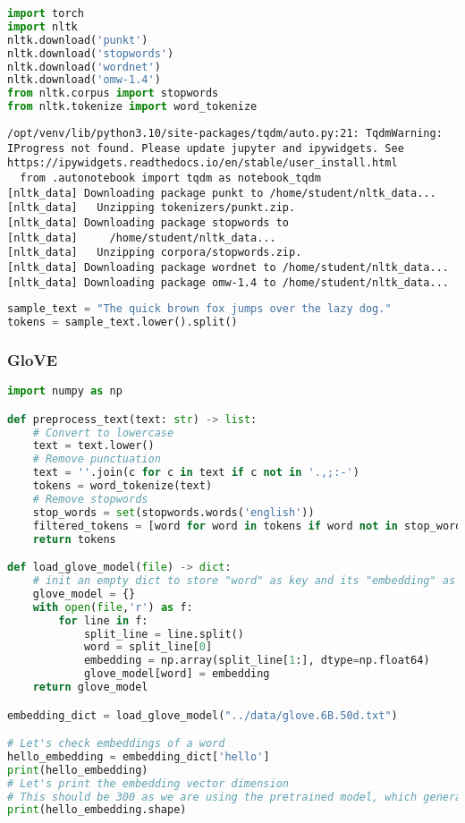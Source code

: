 \begin{lstlisting}[language=Python]
import torch
import nltk
nltk.download('punkt')
nltk.download('stopwords')
nltk.download('wordnet')
nltk.download('omw-1.4')
from nltk.corpus import stopwords
from nltk.tokenize import word_tokenize
\end{lstlisting}

\begin{lstlisting}
/opt/venv/lib/python3.10/site-packages/tqdm/auto.py:21: TqdmWarning: IProgress not found. Please update jupyter and ipywidgets. See https://ipywidgets.readthedocs.io/en/stable/user_install.html
  from .autonotebook import tqdm as notebook_tqdm
[nltk_data] Downloading package punkt to /home/student/nltk_data...
[nltk_data]   Unzipping tokenizers/punkt.zip.
[nltk_data] Downloading package stopwords to
[nltk_data]     /home/student/nltk_data...
[nltk_data]   Unzipping corpora/stopwords.zip.
[nltk_data] Downloading package wordnet to /home/student/nltk_data...
[nltk_data] Downloading package omw-1.4 to /home/student/nltk_data...
\end{lstlisting}

\begin{lstlisting}[language=Python]
sample_text = "The quick brown fox jumps over the lazy dog."
tokens = sample_text.lower().split()
\end{lstlisting}

\subsubsection{GloVE}\label{glove}

\begin{lstlisting}[language=Python]
import numpy as np

def preprocess_text(text: str) -> list:
    # Convert to lowercase
    text = text.lower()
    # Remove punctuation
    text = ''.join(c for c in text if c not in '.,;:-')
    tokens = word_tokenize(text)
    # Remove stopwords
    stop_words = set(stopwords.words('english'))
    filtered_tokens = [word for word in tokens if word not in stop_words]
    return tokens

def load_glove_model(file) -> dict:
    # init an empty dict to store "word" as key and its "embedding" as value.
    glove_model = {}
    with open(file,'r') as f:
        for line in f:
            split_line = line.split()
            word = split_line[0]
            embedding = np.array(split_line[1:], dtype=np.float64)
            glove_model[word] = embedding
    return glove_model

embedding_dict = load_glove_model("../data/glove.6B.50d.txt")

# Let's check embeddings of a word
hello_embedding = embedding_dict['hello']
print(hello_embedding)
# Let's print the embedding vector dimension
# This should be 300 as we are using the pretrained model, which generates 300 dim embedding vector
print(hello_embedding.shape)
\end{lstlisting}

